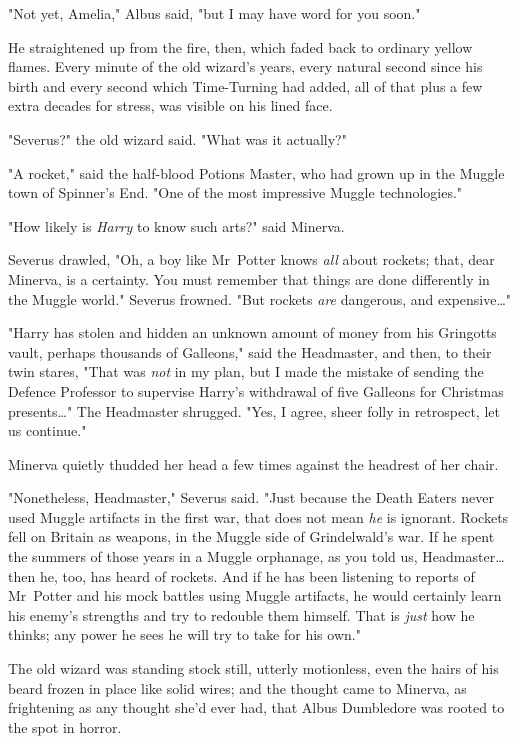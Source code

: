 "Not yet, Amelia," Albus said, "but I may have word for you soon."

He straightened up from the fire, then, which faded back to ordinary yellow
flames. Every minute of the old wizard's years, every natural second since his
birth and every second which Time-Turning had added, all of that plus a few
extra decades for stress, was visible on his lined face.

"Severus?" the old wizard said. "What was it actually?"

"A rocket," said the half-blood Potions Master, who had grown up in the Muggle
town of Spinner's End. "One of the most impressive Muggle technologies."

"How likely is \emph{Harry} to know such arts?" said Minerva.

Severus drawled, "Oh, a boy like Mr~Potter knows \emph{all} about rockets;
that, dear Minerva, is a certainty. You must remember that things are done
differently in the Muggle world." Severus frowned. "But rockets \emph{are}
dangerous, and expensive…"

"Harry has stolen and hidden an unknown amount of money from his Gringotts
vault, perhaps thousands of Galleons," said the Headmaster, and then, to their
twin stares, "That was \emph{not} in my plan, but I made the mistake of sending
the Defence Professor to supervise Harry's withdrawal of five Galleons for
Christmas presents…" The Headmaster shrugged. "Yes, I agree, sheer folly
in retrospect, let us continue."

Minerva quietly thudded her head a few times against the headrest of her chair.

"Nonetheless, Headmaster," Severus said. "Just because the Death Eaters never
used Muggle artifacts in the first war, that does not mean \emph{he} is
ignorant. Rockets fell on Britain as weapons, in the Muggle side of
Grindelwald's war. If he spent the summers of those years in a Muggle
orphanage, as you told us, Headmaster…then he, too, has heard of
rockets. And if he has been listening to reports of Mr~Potter and his mock
battles using Muggle artifacts, he would certainly learn his enemy's strengths
and try to redouble them himself. That is \emph{just} how he thinks; any power
he sees he will try to take for his own."

The old wizard was standing stock still, utterly motionless, even the hairs of
his beard frozen in place like solid wires; and the thought came to Minerva, as
frightening as any thought she'd ever had, that Albus Dumbledore was rooted to
the spot in horror.

